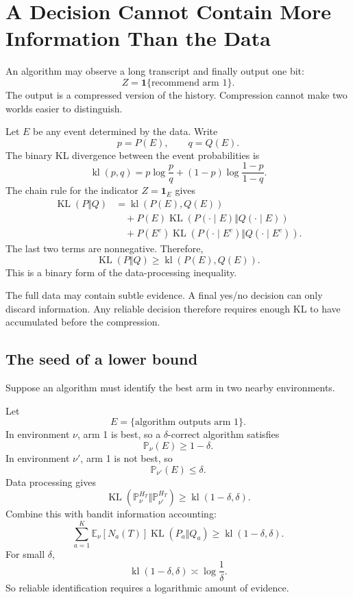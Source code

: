 \documentclass[en,nofont,11pt]{elegantbook}
\newcommand{\E}{\mathbb{E}}
\newcommand{\Pbb}{\mathbb{P}}
\newcommand{\one}{\mathbf{1}}
\newcommand{\KL}{\operatorname{KL}}
\newcommand{\kl}{\operatorname{kl}}
\begin{document}
\chapter{A Decision Cannot Contain More Information Than the Data}

An algorithm may observe a long transcript and finally output one bit:
\[
Z=\one\{\text{recommend arm 1}\}.
\]
The output is a compressed version of the history. Compression cannot make two worlds easier to distinguish.

Let $E$ be any event determined by the data. Write
\[
p=P(E),
\qquad
q=Q(E).
\]
The binary KL divergence between the event probabilities is
\[
\kl(p,q)
=
p\log\frac{p}{q}
+(1-p)\log\frac{1-p}{1-q}.
\]
The chain rule for the indicator $Z=\one_E$ gives
\begin{align*}
\KL(P\Vert Q)
&=
\kl(P(E),Q(E))\\
&\quad+
P(E)\KL(P(\cdot\mid E)\Vert Q(\cdot\mid E))\\
&\quad+
P(E^c)\KL(P(\cdot\mid E^c)\Vert Q(\cdot\mid E^c)).
\end{align*}
The last two terms are nonnegative. Therefore,
\[
\boxed{
\KL(P\Vert Q)
\ge
\kl(P(E),Q(E)).
}
\]
This is a binary form of the data-processing inequality.

\begin{keyidea}
The full data may contain subtle evidence. A final yes/no decision can only discard information. Any reliable decision therefore requires enough KL to have accumulated before the compression.
\end{keyidea}

\section{The seed of a lower bound}

Suppose an algorithm must identify the best arm in two nearby environments.

Let
\[
E=\{\text{algorithm outputs arm 1}\}.
\]
In environment $\nu$, arm 1 is best, so a $\delta$-correct algorithm satisfies
\[
\Pbb_\nu(E)\ge1-\delta.
\]
In environment $\nu'$, arm 1 is not best, so
\[
\Pbb_{\nu'}(E)\le\delta.
\]
Data processing gives
\[
\KL(\Pbb_\nu^{H_T}\Vert\Pbb_{\nu'}^{H_T})
\ge
\kl(1-\delta,\delta).
\]
Combine this with bandit information accounting:
\[
\boxed{
\sum_{a=1}^{K}
\E_\nu[N_a(T)]\KL(P_a\Vert Q_a)
\ge
\kl(1-\delta,\delta).
}
\]
For small $\delta$,
\[
\kl(1-\delta,\delta)
\asymp
\log\frac1\delta.
\]
So reliable identification requires a logarithmic amount of evidence.
\end{document}
